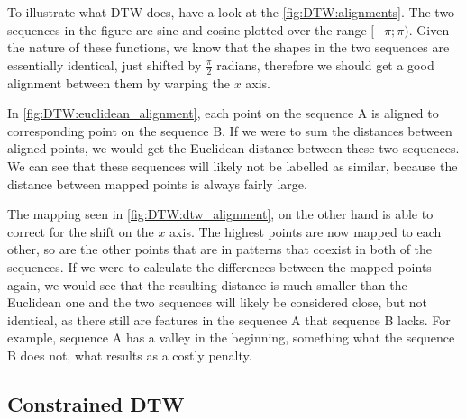 \documentclass[parskip]{cs4rep}
\begin{document}
To illustrate what DTW does, have a look at the \autoref{fig:DTW:alignments}. The two sequences in the figure are sine and cosine plotted over the range $[-\pi; \pi)$. Given the nature of these functions, we know that the shapes in the two sequences are essentially identical, just shifted by $\frac{\pi}{2}$ radians, therefore we should get a good alignment between them by warping the $x$ axis.

In \autoref{fig:DTW:euclidean_alignment}, each point on the sequence A is aligned to corresponding point on the sequence B. If we were to sum the distances between aligned points, we would get the Euclidean distance between these two sequences. We can see that these sequences will likely not be labelled as similar, because the distance between mapped points is always fairly large. 

The mapping seen in \autoref{fig:DTW:dtw_alignment}, on the other hand is able to correct for the shift on the $x$ axis. The highest points are now mapped to each other, so are the other points that are in patterns that coexist in both of the sequences. If we were to calculate the differences between the mapped points again, we would see that the resulting distance is much smaller than the Euclidean one and the two sequences will likely be considered close, but not identical, as there still are features in the sequence A that sequence B lacks. For example, sequence A has a valley in the beginning, something what the sequence B does not, what results as a costly penalty.

\subsection{Constrained DTW}
\end{document}
